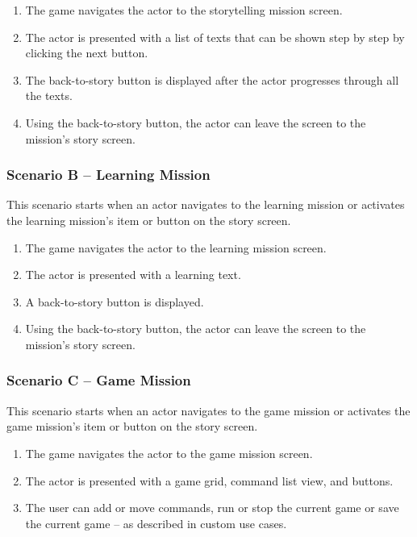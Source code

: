 \begin{enumerate}
    \item The game navigates the actor to the storytelling mission screen.
    \item The actor is presented with a list of texts that can be shown step by step by clicking the next button.
    \item The back-to-story button is displayed after the actor progresses through all the texts.
    \item Using the back-to-story button, the actor can leave the screen to the mission's story screen.
\end{enumerate}

\subsubsection*{Scenario B -- Learning Mission}

This scenario starts when an actor navigates to the learning mission or activates the learning mission's item or button on the story screen.

\begin{enumerate}
    \item The game navigates the actor to the learning mission screen.
    \item The actor is presented with a learning text.
    \item A back-to-story button is displayed.
    \item Using the back-to-story button, the actor can leave the screen to the mission's story screen.
\end{enumerate}

\subsubsection*{Scenario C -- Game Mission}

This scenario starts when an actor navigates to the game mission or activates the game mission's item or button on the story screen.

\begin{enumerate}
    \item The game navigates the actor to the game mission screen.
    \item The actor is presented with a game grid, command list view, and buttons.
    \item The user can add or move commands, run or stop the current game or save the current game -- as described in custom use cases.
\end{enumerate}

